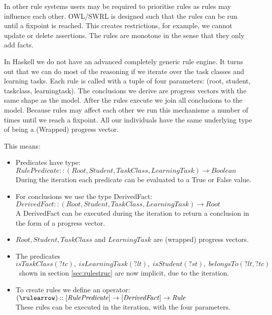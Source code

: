 In other rule systems users may be required to prioritise rules as rules may influence each other.
OWL/SWRL is designed such that the rules can be run until a fixpoint is reached.
This creates restrictions, for example, we cannot update or delete assertions.
The rules are monotone in the sense that they only add facts.

In Haskell we do not have an advanced completely generic rule engine.
It turns out that we can do most of the reasoning if we iterate over the task classes and learning tasks.
Each rule is called with a tuple of four parameters: (root, student, taskclass, learningtask).
The conclusions we derive are progress vectors with the same shape as the model. 
After the rules execute we join all conclusions to the model.
Because rules may affect each other we run this mechanisme a number of times until we reach a fixpoint.
All our individuals have the same underlying type of being a (Wrapped) progress vector.

This means:
\begin{itemize}
\item Predicates have type:\\
$\mathit{ RulePredicate :: (Root, Student, TaskClass, LearningTask) \rightarrow Boolean}$\\
During the iteration each predicate can be evaluated to a True or False value.
 
\item For conclusions we use the type DerivedFact:\\
$ \mathit{ DerivedFact :: (Root, Student, TaskClass, LearningTask) \rightarrow Root}$\\
A DerivedFact can be executed during the iteration to return a conclusion in the form of a progress vector.

\item $\mathit{Root, Student, TaskClass}$ and $\mathit{LearningTask}$ are (wrapped) progress vectors.

\item The predicates  $\mathit{isTaskClass(?tc), \; isLearningTask(?lt), \; isStudent(?st), \;belongsTo(?lt, ?tc)}$\ shown in section \ref{sec:rulestruc} are now implicit, due to the iteration.

	
\item To create rules we define an operator:\\ 
$ (\rulearrow) :: \mathit{[RulePredicate] \rightarrow [DerivedFact] \rightarrow Rule}$\\
These rules can be executed in the iteration, with the four parameters.
 
\end{itemize}

